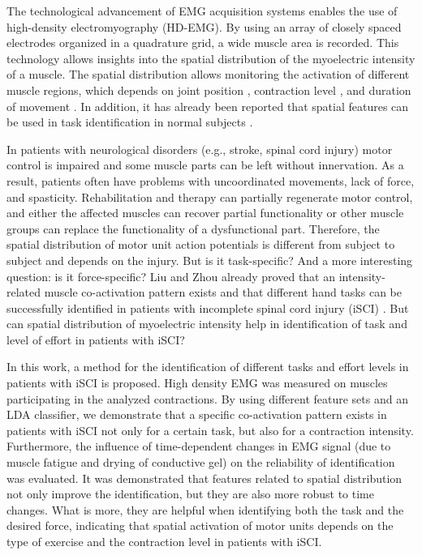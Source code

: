 The technological advancement of EMG acquisition systems \citep{Merletti2009, Merletti2010} enables the use of high-density electromyography (HD-EMG). By using an array of closely spaced electrodes organized in a quadrature grid, a wide muscle area is recorded. This technology allows insights into the spatial distribution of the myoelectric intensity of a muscle. The spatial distribution allows monitoring the activation of different muscle regions, which depends on joint position \citep{Vieira2010}, contraction level \citep{Holtermann2005}, and duration of movement \citep{Tucker2009}. In addition, it has already been reported that spatial features can be used in task identification in normal subjects \citep{Stango2015, Rojas-Martinez2013}.

In patients with neurological disorders (e.g., stroke, spinal cord injury) motor control is impaired and some muscle parts can be left without innervation. As a result, patients often have problems with uncoordinated movements, lack of force, and spasticity. Rehabilitation and therapy can partially regenerate motor control, and either the affected muscles can recover partial functionality or other muscle groups can replace the functionality of a dysfunctional part. Therefore, the spatial distribution of motor unit action potentials is different from subject to subject and depends on the injury. But is it task-specific? And a more interesting question: is it force-specific? Liu and Zhou already proved that an intensity-related muscle co-activation pattern exists and that different hand tasks can be successfully identified in patients with incomplete spinal cord injury (iSCI) \citep{Liu2013}. But can spatial distribution of myoelectric intensity help in identification of task and level of effort in patients with iSCI?

In this work, a method for the identification of different tasks and effort levels in patients with iSCI is proposed. High density EMG was measured on muscles participating in the analyzed contractions. By using different feature sets and an LDA classifier, we demonstrate that a specific co-activation pattern exists in patients with iSCI not only for a certain task, but also for a contraction intensity. Furthermore, the influence of time-dependent changes in EMG signal (due to muscle fatigue and drying of conductive gel) on the reliability of identification was evaluated. It was demonstrated that features related to spatial distribution not only improve the identification, but they are also more robust to time changes. What is more, they are helpful when identifying both the task and the desired force, indicating that spatial activation of motor units depends on the type of exercise and the contraction level in patients with iSCI.


